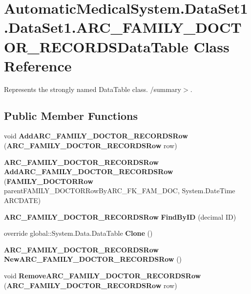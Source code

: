 \section{AutomaticMedicalSystem.DataSet1.DataSet1.ARC\_\-FAMILY\_\-DOCTOR\_\-RECORDSDataTable Class Reference}
\label{class_automatic_medical_system_1_1_data_set1_1_1_a_r_c___f_a_m_i_l_y___d_o_c_t_o_r___r_e_c_o_r_d_s_data_table}
Represents the strongly named DataTable class. /summary$>$.  


\subsection*{Public Member Functions}
\begin{CompactItemize}
\item 
void \textbf{AddARC\_\-FAMILY\_\-DOCTOR\_\-RECORDSRow} ({\bf ARC\_\-FAMILY\_\-DOCTOR\_\-RECORDSRow} row)\label{class_automatic_medical_system_1_1_data_set1_1_1_a_r_c___f_a_m_i_l_y___d_o_c_t_o_r___r_e_c_o_r_d_s_data_table_65024983b4f4c214c3257356921b1558}

\item 
{\bf ARC\_\-FAMILY\_\-DOCTOR\_\-RECORDSRow} \textbf{AddARC\_\-FAMILY\_\-DOCTOR\_\-RECORDSRow} ({\bf FAMILY\_\-DOCTORRow} parentFAMILY\_\-DOCTORRowByARC\_\-FK\_\-FAM\_\-DOC, System.DateTime ARCDATE)\label{class_automatic_medical_system_1_1_data_set1_1_1_a_r_c___f_a_m_i_l_y___d_o_c_t_o_r___r_e_c_o_r_d_s_data_table_db06750f989f2217ab1652581e34bc2c}

\item 
{\bf ARC\_\-FAMILY\_\-DOCTOR\_\-RECORDSRow} \textbf{FindByID} (decimal ID)\label{class_automatic_medical_system_1_1_data_set1_1_1_a_r_c___f_a_m_i_l_y___d_o_c_t_o_r___r_e_c_o_r_d_s_data_table_069bee515ff532b681fac1a7d623f31e}

\item 
override global::System.Data.DataTable \textbf{Clone} ()\label{class_automatic_medical_system_1_1_data_set1_1_1_a_r_c___f_a_m_i_l_y___d_o_c_t_o_r___r_e_c_o_r_d_s_data_table_3bf7881415f6747be7bba26dfc3dc5f0}

\item 
{\bf ARC\_\-FAMILY\_\-DOCTOR\_\-RECORDSRow} \textbf{NewARC\_\-FAMILY\_\-DOCTOR\_\-RECORDSRow} ()\label{class_automatic_medical_system_1_1_data_set1_1_1_a_r_c___f_a_m_i_l_y___d_o_c_t_o_r___r_e_c_o_r_d_s_data_table_c9d76f8f406836b0c20f42074ae0c437}

\item 
void \textbf{RemoveARC\_\-FAMILY\_\-DOCTOR\_\-RECORDSRow} ({\bf ARC\_\-FAMILY\_\-DOCTOR\_\-RECORDSRow} row)\label{class_automatic_medical_system_1_1_data_set1_1_1_a_r_c___f_a_m_i_l_y___d_o_c_t_o_r___r_e_c_o_r_d_s_data_table_e0505b26b22349ada737ed37edc5d314}

\end{CompactItemize}
